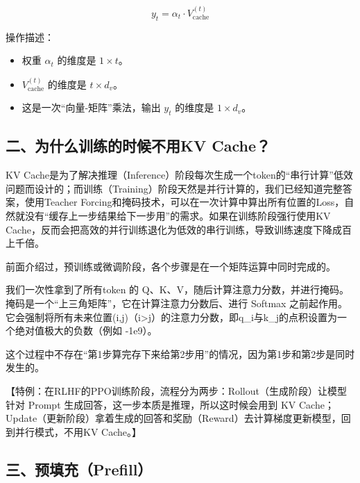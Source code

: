 \[
y_t = \alpha_t \cdot V_{\mathrm{cache}}^{(t)}
\]

操作描述：

\begin{itemize}
\tightlist
\item
  权重 \(\alpha_t\) 的维度是 \(1 \times t\)。
\item
  \(V_{\mathrm{cache}}^{(t)}\) 的维度是 \(t \times d_v\)。
\item
  这是一次``向量-矩阵''乘法，输出 \(y_t\) 的维度是 \(1 \times d_v\)。
\end{itemize}

\hypertarget{ux4e8cux4e3aux4ec0ux4e48ux8badux7ec3ux7684ux65f6ux5019ux4e0dux7528kv-cache}{%
\subsection{二、为什么训练的时候不用KV Cache？}\label{ux4e8cux4e3aux4ec0ux4e48ux8badux7ec3ux7684ux65f6ux5019ux4e0dux7528kv-cache}}

KV Cache是为了解决推理（Inference）阶段每次生成一个token的``串行计算''低效问题而设计的；而训练（Training）阶段天然是并行计算的，我们已经知道完整答案，使用Teacher Forcing和掩码技术，可以在一次计算中算出所有位置的Loss，自然就没有``缓存上一步结果给下一步用''的需求。如果在训练阶段强行使用KV Cache，反而会把高效的并行训练退化为低效的串行训练，导致训练速度下降成百上千倍。

前面介绍过，预训练或微调阶段，各个步骤是在一个矩阵运算中同时完成的。

我们一次性拿到了所有token 的 Q、K、V，随后计算注意力分数，并进行掩码。掩码是一个``上三角矩阵''，它在计算注意力分数后、进行 Softmax 之前起作用。它会强制将所有未来位置(i,j)（i\textgreater j）的注意力分数，即q\_i与k\_j的点积设置为一个绝对值极大的负数（例如 -1e9）。

这个过程中不存在``第1步算完存下来给第2步用''的情况，因为第1步和第2步是同时发生的。

【特例：在RLHF的PPO训练阶段，流程分为两步：Rollout（生成阶段）让模型针对 Prompt 生成回答，这一步本质是推理，所以这时候会用到 KV Cache；Update（更新阶段）拿着生成的回答和奖励（Reward）去计算梯度更新模型，回到并行模式，不用KV Cache。】

\hypertarget{ux4e09ux9884ux586bux5145prefill}{%
\subsection{三、预填充（Prefill）}\label{ux4e09ux9884ux586bux5145prefill}}

